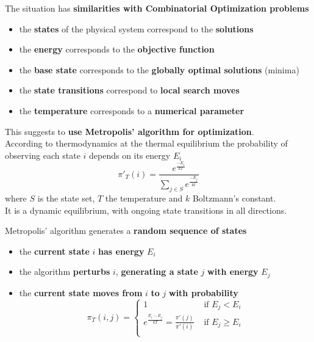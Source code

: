 \documentclass[11pt]{article}
\begin{document}
	The situation has \textbf{similarities with Combinatorial Optimization problems}
	\begin{itemize}
		\item the \textbf{states} of the physical system correspond to the \textbf{solutions}
		
		\item the \textbf{energy} corresponds to the \textbf{objective function}
		
		\item the \textbf{base state} corresponds to the \textbf{globally optimal solutions} (minima)
		
		\item the \textbf{state transitions} correspond to \textbf{local search moves}
		
		\item the \textbf{temperature} corresponds to a \textbf{numerical parameter}
	\end{itemize}
	
	This suggests to \textbf{use Metropolis' algorithm for optimization}.\\
	
	According to thermodynamics at the thermal equilibrium the probability of observing each state $i$ depends on its energy $E_i$
	$$ \pi'_T (i) = \frac{e^{\frac{-E_i}{k T}}}{\sum_{j \in S} e^{\frac{-E_j}{k t}}}  $$
	where $S$ is the state set, $T$ the temperature and $k$ Boltzmann's constant.\\
	
	It is a dynamic equilibrium, with ongoing state transitions in all directions.\\
	
	\newpage
	
	Metropolis' algorithm generates a \textbf{random sequence of states}
	\begin{itemize}
		\item the \textbf{current state} $i$ \textbf{has energy} $E_i$
		
		\item the algorithm \textbf{perturbs} $i$, \textbf{generating a state} $j$ \textbf{with energy} $E_j$
		
		\item the \textbf{current state moves from} $i$ \textbf{to} $j$ \textbf{with probability}
		$$ \pi_T (i,j) = \begin{cases}
			1 & \text{ if } E_j < E_i \\
			e^{\frac{E_i - E_j}{k T}} = \frac{\pi' (j)}{\pi' (i)} & \text{ if } E_j \geq E_i \\
		\end{cases} $$
	\end{itemize}
	
\end{document}
